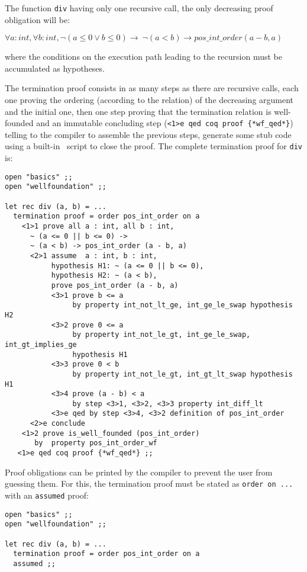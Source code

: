 The function {\tt div} having only one recursive call, the only
decreasing proof obligation will be:

$\forall a : int, \forall b : int,
      \lnot (a \leq 0 \lor b \leq 0) \rightarrow
      ~\lnot(a < b)  \rightarrow pos\_int\_order (a - b, a)
$

\noindent where the conditions on the execution path leading to the
recursion must be accumulated as hypotheses.

The termination proof consists in as many steps as there are recursive
calls, each one proving the ordering (according to the relation) of the
decreasing argument and the
initial one, then one step proving that the termination relation
is well-founded and
an immutable concluding step (\lstinline"<1>e qed coq proof {*wf_qed*}")
telling to the compiler to assemble the previous steps, generate some stub
code using a built-in \coq\ script to close the proof.
The complete termination proof for {\tt div} is:

\noindent
{\scriptsize
\begin{lstlisting}
open "basics" ;;
open "wellfoundation" ;;

let rec div (a, b) = ...
  termination proof = order pos_int_order on a
    <1>1 prove all a : int, all b : int,
      ~ (a <= 0 || b <= 0) ->
      ~ (a < b) -> pos_int_order (a - b, a)
      <2>1 assume  a : int, b : int,
           hypothesis H1: ~ (a <= 0 || b <= 0),
           hypothesis H2: ~ (a < b),
           prove pos_int_order (a - b, a)
           <3>1 prove b <= a
                by property int_not_lt_ge, int_ge_le_swap hypothesis H2
           <3>2 prove 0 <= a
                by property int_not_le_gt, int_ge_le_swap, int_gt_implies_ge
                hypothesis H1
           <3>3 prove 0 < b
                by property int_not_le_gt, int_gt_lt_swap hypothesis H1
           <3>4 prove (a - b) < a
                by step <3>1, <3>2, <3>3 property int_diff_lt
           <3>e qed by step <3>4, <3>2 definition of pos_int_order
      <2>e conclude
    <1>2 prove is_well_founded (pos_int_order)
       by  property pos_int_order_wf
   <1>e qed coq proof {*wf_qed*} ;;
\end{lstlisting}
}

Proof obligations can be printed by the compiler to prevent the user from
guessing them. For this, the termination proof must be stated as
{\tt order on ...} with an {\tt assumed} {\zenon} proof:

{\scriptsize
\begin{lstlisting}
open "basics" ;;
open "wellfoundation" ;;

let rec div (a, b) = ...
  termination proof = order pos_int_order on a
  assumed ;;
\end{lstlisting}
}

